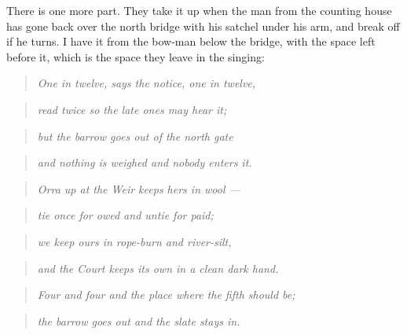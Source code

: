 \documentclass{design/chronicle}
\begin{document}
There is one more part. They take it up when the man from the counting house has gone back over the north bridge with his satchel under his arm, and break off if he turns. I have it from the bow-man below the bridge, with the space left before it, which is the space they leave in the singing:

\begin{quote}\itshape One in twelve, says the notice, one in twelve,\end{quote}

\begin{quote}\itshape read twice so the late ones may hear it;\end{quote}

\begin{quote}\itshape but the barrow goes out of the north gate\end{quote}

\begin{quote}\itshape and nothing is weighed and nobody enters it.\end{quote}

\begin{quote}\itshape \end{quote}

\begin{quote}\itshape Orra up at the Weir keeps hers in wool —\end{quote}

\begin{quote}\itshape tie once for owed and untie for paid;\end{quote}

\begin{quote}\itshape we keep ours in rope-burn and river-silt,\end{quote}

\begin{quote}\itshape and the Court keeps its own in a clean dark hand.\end{quote}

\begin{quote}\itshape \end{quote}

\begin{quote}\itshape Four and four and the place where the fifth should be;\end{quote}

\begin{quote}\itshape the barrow goes out and the slate stays in.\end{quote}
\end{document}
